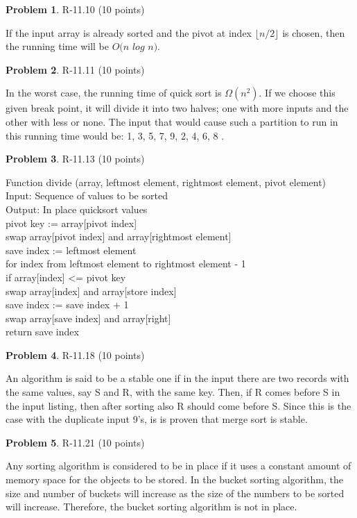 \documentclass[12pt]{report}
\theoremstyle{definition}
\newtheorem{problem}{Problem}
\begin{document}
\begin{problem} 	R-11.10 (10 points) 		
\end{problem}
				If the input array is already sorted and the pivot at index $\lfloor n/2 \rfloor$ is chosen, then 				the running time will be $O(n$ $log$ $n)$.

\begin{problem} 	R-11.11 (10 points) 		
\end{problem}
				In the worst case, the running time of quick sort is $\Omega(n^2)$. If we choose this given 				break point, it will divide it into two halves; one with more inputs and the other with less or 				none. \smallskip \newline
				The input that would cause such a partition to run in this running time would be:
				1, 3, 5, 7, 9, 2, 4, 6, 8 .

\begin{problem} 	R-11.13 (10 points) 		
\end{problem}
				Function divide (array, leftmost element, rightmost element, pivot element) \\
				Input: Sequence of values to be sorted \\
				Output: In place quicksort values \\
				pivot key := array[pivot index] \\
				swap array[pivot index] and array[rightmost element] \\
				save index := leftmost element \\
				for index from leftmost element to rightmost element - 1 \\
				if array[index] <= pivot key \\
				swap array[index] and array[store index] \\
				save index := save index + 1 \\
				swap array[save index] and array[right] \\
				return save index  

\begin{problem} 	R-11.18 (10 points) 		
\end{problem}
				An algorithm is said to be a stable one if in the input there are two records with the same 					values, say S and R, with the same key. Then, if R comes before S in the input listing, then 				after sorting also R should come before S. Since this is the case with the duplicate input 9's, 				is is proven that merge sort is stable.

\begin{problem} 	R-11.21 (10 points) 		
\end{problem}
				Any sorting algorithm is considered to be in place if it uses a constant amount of memory 					space for the objects to be stored. In the bucket sorting algorithm, the size and number of 				buckets will increase as the size of the numbers to be sorted will increase. Therefore, the 					bucket sorting algorithm is not in place.
\end{document}
